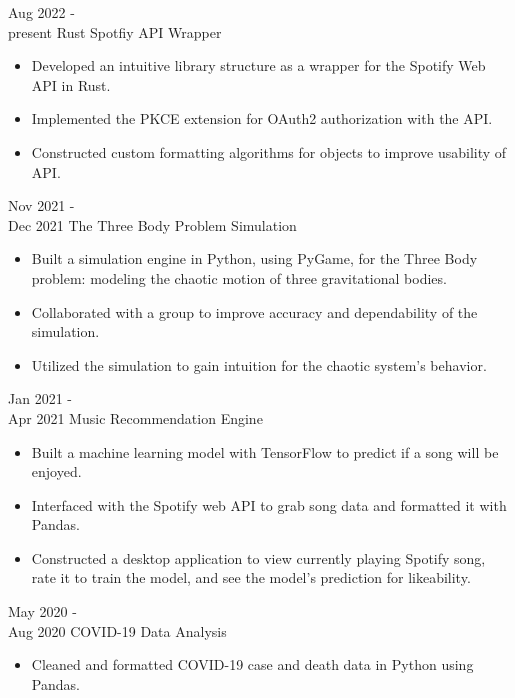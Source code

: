 \documentclass[9pt]{developercv} %
\begin{document}


\begin{entrylist}
	\entry
		{Aug 2022 -\\present}
		{Rust Spotfiy API Wrapper}
		{}
		{\begin{itemize}[noitemsep, topsep=1pt]
			\item Developed an intuitive library structure as a wrapper for the Spotify Web API in Rust. 
			\item Implemented the PKCE extension for OAuth2 authorization with the API. 
			\item Constructed custom formatting algorithms for objects to improve usability of API.
		\end{itemize}}
	\entry
		{Nov 2021 -\\Dec 2021}
		{The Three Body Problem Simulation}
		{}
		{\begin{itemize}[noitemsep, topsep=1pt]
			\item Built a simulation engine in Python, using PyGame, for the Three Body problem: modeling the chaotic motion of three gravitational bodies. 
			\item Collaborated with a group to improve accuracy and dependability of the simulation.
			\item Utilized the simulation to gain intuition for the chaotic system's behavior.
		\end{itemize}}
	\entry
		{Jan 2021 -\\Apr 2021}
		{Music Recommendation Engine}
		{}
		{\begin{itemize}[noitemsep, topsep=1pt]
			\item Built a machine learning model with TensorFlow to predict if a song will be enjoyed.
			\item Interfaced with the Spotify web API to grab song data and formatted it with Pandas. 
			\item Constructed a desktop application to view currently playing Spotify song, rate it to train the model, and see the model's prediction for likeability. 
		\end{itemize}}
	\entry 
		{May 2020 -\\Aug 2020}
		{COVID-19 Data Analysis}
		{}
		{\begin{itemize}[noitemsep, topsep=1pt]
			\item Cleaned and formatted COVID-19 case and death data in Python using Pandas.

\end{itemize}}
\end{entrylist}
\end{document}
